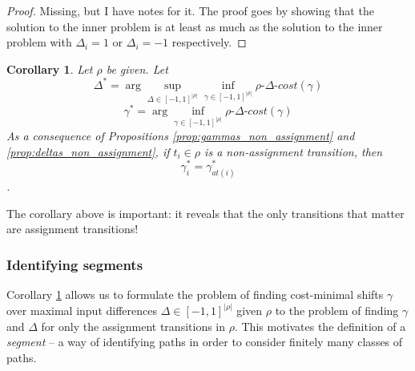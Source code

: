 \documentclass{article}
\newtheorem{corollary}{Corollary}[theorem]
\newcommand{\1}{\langle 1 \rangle}
\newcommand{\2}{\langle 2 \rangle}
\begin{document}
\begin{proof}
    Missing, but I have notes for it. The proof goes by showing that the solution to the inner problem is at least as much as the solution to the inner problem with $\Delta_i = 1$ or $\Delta_i = -1$ respectively.
\end{proof}

\begin{corollary}
    \label{cor:non_assignment_solved}
    Let $\rho$ be given. Let \[\Delta^* = \arg \sup_{\Delta \in [-1, 1]^{|\rho|}} \inf_{\gamma \in [-1, 1]^{|\rho|}} \rho\text{-}\Delta\text{-}cost(\gamma)\]
    \[\gamma^* = \arg \inf_{\gamma \in [-1, 1]^{|\rho|}} \rho\text{-}\Delta\text{-}cost(\gamma)\]
    As a consequence of Propositions \ref{prop:gammas_non_assignment} and \ref{prop:deltas_non_assignment}, if $t_i \in \rho$ is a non-assignment transition, then \[\gamma_i^* = 
    \gamma^*_{at(i)}\].

\end{corollary}

The corollary above is important: it reveals that the only transitions that matter are assignment transitions!

\subsubsection{Identifying segments}

Corollary \ref{cor:non_assignment_solved} allows us to formulate the problem of finding cost-minimal shifts $\gamma$ over maximal input differences $\Delta \in [-1, 1]^{|\rho|}$ given $\rho$ to the problem of finding $\gamma$ and $\Delta$ for only the assignment transitions in $\rho$. This motivates the definition of a \textit{segment} -- a way of identifying paths in order to consider finitely many classes of paths.
\end{document}
